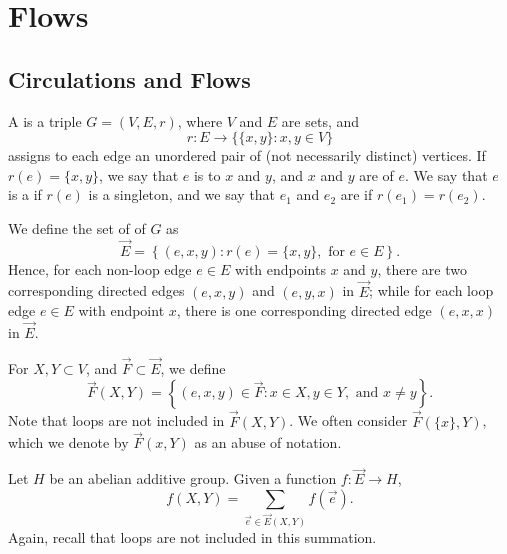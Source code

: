 \chapter{Flows}

\section{Circulations and Flows}

A  is a triple \(G = (V, E, r)\),
where \(V\) and \(E\) are sets, and
\begin{equation}
	r \colon E \to \{ \{x, y\} : x, y \in V \}
\end{equation}
assigns to each edge an unordered pair of (not necessarily distinct) vertices.
If \(r(e) = \{x, y\}\), we say that \(e\) is  to \(x\) and \(y\), and \(x\) and \(y\) are  of \(e\).
We say that \(e\) is a  if \(r(e)\) is a singleton, and we say that \(e_1\) and \(e_2\) are  if \(r(e_1) = r(e_2)\).

We define the set of  of \(G\) as
\begin{equation}
	\vec{E} =
	\left\{
	(e, x, y)
	:
	r(e) = \{x, y\},
	\text{ for } e \in E
	\right\}.
\end{equation}
Hence, for each non-loop edge \(e \in E\) with endpoints \(x\) and \(y\),
there are two corresponding directed edges \((e, x, y)\) and \((e, y, x)\) in \(\vec{E}\);
while for each loop edge \(e \in E\) with endpoint \(x\),
there is one corresponding directed edge \((e, x, x)\) in \(\vec{E}\).

For \(X, Y \subset V\), and \(\vec{F} \subset \vec{E}\), we define
\begin{equation}
	\vec{F}(X, Y) =
	\left\{
	(e, x, y) \in \vec{F}
	:
	x \in X,
	y \in Y,
	\text{ and } x \neq y
	\right\}.
\end{equation}
Note that loops are not included in \(\vec{F}(X, Y)\).
We often consider \(\vec{F}(\{x\}, Y)\), which we denote by \(\vec{F}(x, Y)\) as an abuse of notation.

Let \(H\) be an abelian additive group.
Given a function \(f : \vec{E} \to H\),
\begin{equation}
	f(X, Y) = \sum_{\vec{e} \in \vec{E}(X, Y)} f(\vec{e}).
\end{equation}
Again, recall that loops are not included in this summation.

